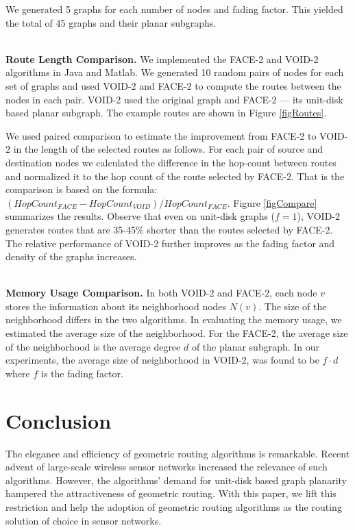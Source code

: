 \documentclass[conference]{IEEEtran}
\begin{document}
We generated 5 graphs for each number of nodes and fading factor.
This yielded the total of 45 graphs and their planar subgraphs.

\ \\ \textbf{Route Length Comparison.} We implemented the FACE-2 and
VOID-2 algorithms in Java and Matlab. We generated 10 random pairs of
nodes for each set of graphs and used VOID-2 and FACE-2 to compute the
routes between the nodes in each pair. VOID-2 used the original graph
and FACE-2 --- its unit-disk based planar subgraph. The
example routes are shown in Figure \ref{figRoutes}.

We used paired comparison to estimate the improvement from FACE-2 to
VOID-2 in the length of the selected routes as follows. For each pair
of source and destination nodes we calculated the difference in the
hop-count between routes and normalized it to the hop count of the
route selected by FACE-2. That is the comparison is based on the
formula: $(HopCount_{FACE} - HopCount_{VOID})/HopCount_{FACE}$. Figure
\ref{figCompare} summarizes the results. Observe that even on
unit-disk graphs ($f=1$), VOID-2 generates routes that are 35-45\%
shorter than the routes selected by FACE-2. The relative performance
of VOID-2 further improves as the fading factor and density of the
graphs increases.


\ \\ \textbf{Memory Usage Comparison.} In both VOID-2 and FACE-2, each
node $v$ stores the information about its neighborhood nodes $N(v)$.
The size of the neighborhood differs in the two algorithms. In
evaluating the memory usage, we estimated the average size of the
neighborhood. For the FACE-2, the average size of the neighborhood is
the average degree $d$ of the planar subgraph. In our experiments, the
average size of neighborhood in VOID-2, was found to be $f \cdot d$
where $f$ is the fading factor.


\section{Conclusion}
\label{SecConclusion}

The elegance and efficiency of geometric routing algorithms is
remarkable. Recent advent of large-scale wireless sensor networks
increased the relevance of such algorithms. However, the algorithms'
demand for unit-disk based graph planarity hampered the attractiveness
of geometric routing.  With this paper, we lift this restriction and
help the adoption of geometric routing algorithms as the routing
solution of choice in sensor networks.
\end{document}
